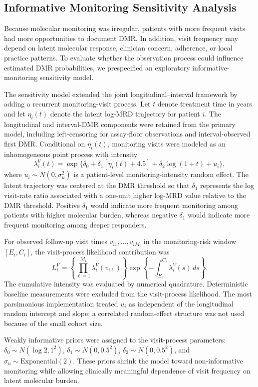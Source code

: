 \subsection{Informative Monitoring Sensitivity Analysis}

Because molecular monitoring was irregular, patients with more frequent visits had more opportunities to document DMR. In addition, visit frequency may depend on latent molecular response, clinician concern, adherence, or local practice patterns. To evaluate whether the observation process could influence estimated DMR probabilities, we prespecified an exploratory informative-monitoring sensitivity model.

The sensitivity model extended the joint longitudinal--interval framework by adding a recurrent monitoring-visit process. Let \(t\) denote treatment time in years and let \(\eta_i(t)\) denote the latent log-MRD trajectory for patient \(i\). The longitudinal and interval-DMR components were retained from the primary model, including left-censoring for assay-floor observations and interval-observed first DMR. Conditional on \(\eta_i(t)\), monitoring visits were modeled as an inhomogeneous point process with intensity
\[
\lambda_i^{V}(t)=
\exp\{\delta_0+\delta_1[\eta_i(t)+4.5]
+\delta_2\log(1+t)+u_i\},
\]
where \(u_i\sim N(0,\sigma_u^2)\) is a patient-level monitoring-intensity random effect. The latent trajectory was centered at the DMR threshold so that \(\delta_1\) represents the log visit-rate ratio associated with a one-unit higher log-MRD value relative to the DMR threshold. Positive \(\delta_1\) would indicate more frequent monitoring among patients with higher molecular burden, whereas negative \(\delta_1\) would indicate more frequent monitoring among deeper responders.

For observed follow-up visit times \(v_{i1},\ldots,v_{iM_i}\) in the monitoring-risk window \([E_i,C_i]\), the visit-process likelihood contribution was
\[
L_i^{V}=
\left\{\prod_{\ell=1}^{M_i}\lambda_i^{V}(v_{i\ell})\right\}
\exp\left\{-\int_{E_i}^{C_i}\lambda_i^{V}(s)\,ds\right\}.
\]
The cumulative intensity was evaluated by numerical quadrature. Deterministic baseline measurements were excluded from the visit-process likelihood. The most parsimonious implementation treated \(u_i\) as independent of the longitudinal random intercept and slope; a correlated random-effect structure was not used because of the small cohort size.

Weakly informative priors were assigned to the visit-process parameters: \(\delta_0\sim N(\log 2,1^2)\), \(\delta_1\sim N(0,0.5^2)\), \(\delta_2\sim N(0,0.5^2)\), and \(\sigma_u\sim \mathrm{Exponential}(2)\). These priors shrink the model toward non-informative monitoring while allowing clinically meaningful dependence of visit frequency on latent molecular burden.

